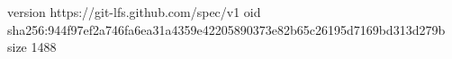 version https://git-lfs.github.com/spec/v1
oid sha256:944f97ef2a746fa6ea31a4359e42205890373e82b65c26195d7169bd313d279b
size 1488
